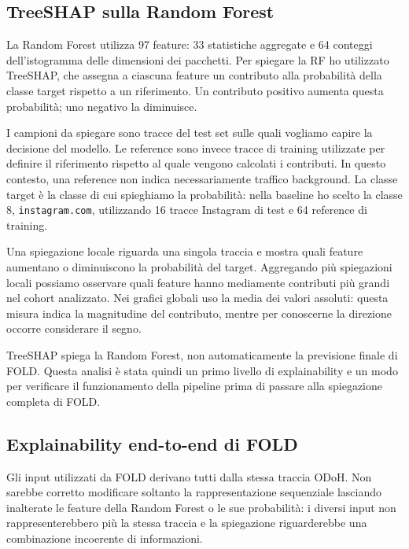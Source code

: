 \documentclass[11pt,a4paper]{article}
\begin{document}
\subsection{TreeSHAP sulla Random Forest}
La Random Forest utilizza 97 feature: 33 statistiche aggregate e 64 conteggi dell'istogramma delle dimensioni dei pacchetti. Per spiegare la RF ho utilizzato TreeSHAP, che assegna a ciascuna feature un contributo alla probabilità della classe target rispetto a un riferimento. Un contributo positivo aumenta questa probabilità; uno negativo la diminuisce.

I campioni da spiegare sono tracce del test set sulle quali vogliamo capire la decisione del modello. Le reference sono invece tracce di training utilizzate per definire il riferimento rispetto al quale vengono calcolati i contributi. In questo contesto, una reference non indica necessariamente traffico background. La classe target è la classe di cui spieghiamo la probabilità: nella baseline ho scelto la classe 8, \texttt{instagram.com}, utilizzando 16 tracce Instagram di test e 64 reference di training.

Una spiegazione locale riguarda una singola traccia e mostra quali feature aumentano o diminuiscono la probabilità del target. Aggregando più spiegazioni locali possiamo osservare quali feature hanno mediamente contributi più grandi nel cohort analizzato. Nei grafici globali uso la media dei valori assoluti: questa misura indica la magnitudine del contributo, mentre per conoscerne la direzione occorre considerare il segno.

TreeSHAP spiega la Random Forest, non automaticamente la previsione finale di FOLD. Questa analisi è stata quindi un primo livello di explainability e un modo per verificare il funzionamento della pipeline prima di passare alla spiegazione completa di FOLD.

\subsection{Explainability end-to-end di FOLD}
Gli input utilizzati da FOLD derivano tutti dalla stessa traccia ODoH. Non sarebbe corretto modificare soltanto la rappresentazione sequenziale lasciando inalterate le feature della Random Forest o le sue probabilità: i diversi input non rappresenterebbero più la stessa traccia e la spiegazione riguarderebbe una combinazione incoerente di informazioni.
\end{document}
